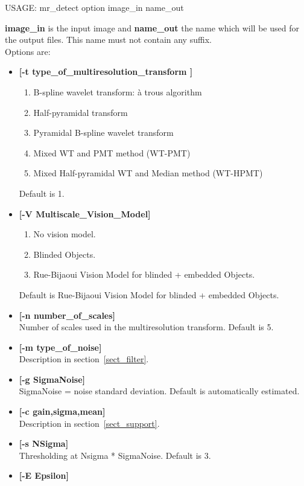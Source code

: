 {\bf
\begin{center}
 USAGE: mr\_detect option image\_in name\_out
\end{center}}
{\bf image\_in} is the input image and {\bf name\_out} the name which will
be used for the output files. This name must not contain any suffix.
\\
Options are:
\begin{itemize}
\baselineskip=0.4truecm
\itemsep=0.1truecm
\item {\bf [-t type\_of\_multiresolution\_transform ]}
\begin{enumerate}
\baselineskip=0.4truecm
\itemsep=0.1truecm
\item B-spline wavelet transform: \`a trous algorithm
\item Half-pyramidal transform
\item Pyramidal B-spline wavelet transform
\item Mixed WT and PMT method (WT-PMT)
\item Mixed Half-pyramidal WT and Median method (WT-HPMT) 
\end{enumerate}
Default is 1.
\item {\bf [-V Multiscale\_Vision\_Model]}
\begin{enumerate}
\baselineskip=0.4truecm
\itemsep=0.1truecm
\item No vision model.
\item Blinded Objects. 
\item Rue-Bijaoui Vision Model for blinded + embedded Objects. 
\end{enumerate}
Default is Rue-Bijaoui Vision Model for blinded + embedded Objects.
\item {\bf [-n number\_of\_scales]} \\
Number of scales used in the multiresolution transform. Default is 5.
\item {\bf [-m type\_of\_noise]} \\
Description in section~\ref{sect_filter}.
\item {\bf [-g SigmaNoise]} \\
SigmaNoise = noise standard deviation. Default is automatically estimated.
\item {\bf [-c gain,sigma,mean]} \\
Description in section~\ref{sect_support}.
\item {\bf [-s NSigma]} \\
Thresholding at Nsigma * SigmaNoise. Default is 3.
\item {\bf [-E Epsilon]} \\

\end{itemize}
